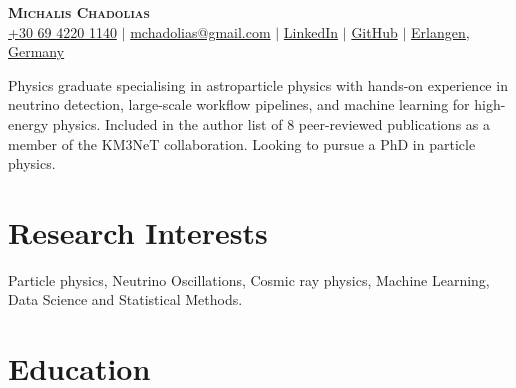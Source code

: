 \documentclass[letterpaper,11pt]{article}
\begin{document}

\begin{center}
    \textbf{\Huge \scshape Michalis Chadolias} \\ \vspace{3pt}
    \small
    \faMobile \hspace{.5pt} \href{tel:00306942201140}{+30 69 4220 1140}
    $|$
    \faAt \hspace{.5pt} \href{mailto:mchadolias@gmail.com}{mchadolias@gmail.com}
    $|$
    \faLinkedinSquare \hspace{.5pt} \href{https://www.linkedin.com/in/michael-chadolias/}{LinkedIn}
    $|$
    \faGithub \hspace{.5pt} \href{https://github.com/mchadolias}{GitHub}
    $|$
    \faMapMarker \hspace{.5pt} \href{https://www.google.com/maps/place/Erlangen/@49.5892592,10.9020837,12z/data=!3m1!4b1!4m6!3m5!1s0x47a1f8c7d57c34a1:0x41eda32beb5c7d0!8m2!3d49.5896744!4d11.0119611!16zL20vMDFjel8x?entry=ttu}{Erlangen, Germany}
\end{center}

Physics graduate specialising in astroparticle physics with hands-on experience in neutrino detection, large-scale workflow pipelines, and machine learning for high-energy physics. Included in the author list of 8 peer-reviewed publications as a member of the KM3NeT collaboration. Looking to pursue a PhD in particle physics.
\vspace{1.5pt}


\section{Research Interests}
  \vspace{2pt}
  \resumeSubHeadingListStart
    \small{\item{
        {Particle physics, Neutrino Oscillations, Cosmic ray physics, Machine Learning, Data Science and Statistical Methods.} 
    }}
  \resumeSubHeadingListEnd

\section{Education}
  \vspace{3pt}
  \resumeSubHeadingListStart
    
\end{document}
